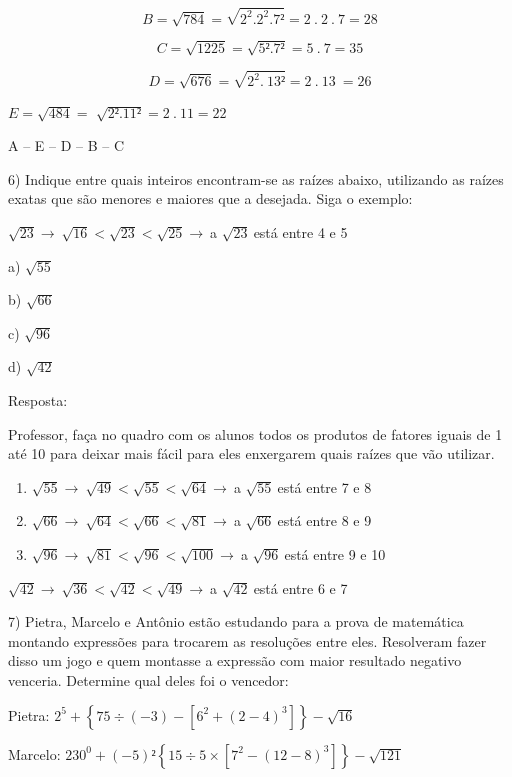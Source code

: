 {{\[B = \sqrt{784} = \sqrt{2^{2}.2^{2}.7²} = 2\ .\ 2\ .\ 7 = 28\]

\[C = \sqrt{1225} = \sqrt{5².7²} = 5\ .\ 7 = 35\]

\[D = \sqrt{676} = \sqrt{2^{2}.\ 13²} = 2\ .\ 13\  = 26\]

\(E = \sqrt{484} =\) \(\sqrt{2².11²} = 2\ .\ 11 = 22\)

A -- E -- D -- B -- C

6) Indique entre quais inteiros encontram-se as raízes abaixo,
utilizando as raízes exatas que são menores e maiores que a desejada.
Siga o exemplo:

\(\sqrt{23} \rightarrow \ \sqrt{16} < \sqrt{23} < \sqrt{25} \rightarrow \ \)a
\(\sqrt{23}\ \)está entre 4 e 5

a) \(\sqrt{55}\)

b) \(\sqrt{66}\)

c) \(\sqrt{96}\)

d) \(\sqrt{42}\)

Resposta:

Professor, faça no quadro com os alunos todos os produtos de fatores
iguais de 1 até 10 para deixar mais fácil para eles enxergarem quais
raízes que vão utilizar.

\begin{enumerate}
\def\labelenumi{\alph{enumi})}
\item
  \(\sqrt{55} \rightarrow \ \sqrt{49} < \sqrt{55} < \sqrt{64} \rightarrow \ \)a
  \(\sqrt{55}\ \)está entre 7 e 8
\item
  \(\sqrt{66} \rightarrow \ \sqrt{64} < \sqrt{66} < \sqrt{81} \rightarrow \ \)a
  \(\sqrt{66}\ \)está entre 8 e 9
\item
  \(\sqrt{96} \rightarrow \ \sqrt{81} < \sqrt{96} < \sqrt{100} \rightarrow \ \)a
  \(\sqrt{96}\ \)está entre 9 e 10
\end{enumerate}

\(\sqrt{42} \rightarrow \ \sqrt{36} < \sqrt{42} < \sqrt{49} \rightarrow \ \)a
\(\sqrt{42}\ \)está entre 6 e 7

7) Pietra, Marcelo e Antônio estão estudando para a prova de matemática
montando expressões para trocarem as resoluções entre eles. Resolveram
fazer disso um jogo e quem montasse a expressão com maior resultado
negativo venceria. Determine qual deles foi o vencedor:

Pietra:
\(2^{5} + \left\{ 75 \div \left( - 3 \right) - \left\lbrack 6^{2} + \left( 2 - 4 \right)^{3} \right\rbrack \right\} - \sqrt{16}\)

Marcelo:
\(230^{0} + ( - 5)²\left\{ 15 \div 5 \times \left\lbrack 7^{2} - \left( 12 - 8 \right)^{3} \right\rbrack \right\} - \sqrt{121}\)

}}
